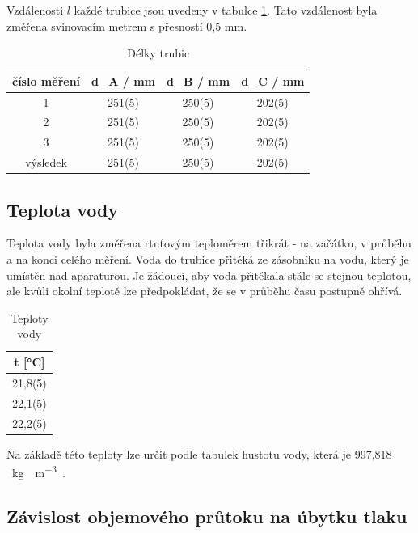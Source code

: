     Vzdálenosti \(l\) každé trubice jsou uvedeny v tabulce \ref{tab:délky}. Tato vzdálenost byla změřena svinovacím metrem s přesností 0,5 mm.

    \begin{table}[h]
        \centering
        \caption{Délky trubic}
        \label{tab:délky}
        \begin{tabular}{|c|c|c|c|} 
        \hline
            číslo měření & d_A / mm & d_B / mm & d_C / mm  \\ 
        \hline
            1            & 251(5)    & 250(5)    & 202(5)   \\
            2            & 251(5)    & 250(5)    & 202(5)   \\
            3            & 251(5)    & 250(5)    & 202(5)   \\ 
        \hline
            výsledek     & 251(5)    & 250(5)    & 202(5)   \\
        \hline
        \end{tabular}
    \end{table}

\subsection{Teplota vody}

    Teplota vody byla změřena rtuťovým teploměrem třikrát - na začátku, v průběhu a na konci celého měření. Voda do trubice přitéká ze zásobníku na vodu, který je umístěn nad aparaturou. Je žádoucí, aby voda přitékala stále se stejnou teplotou, ale kvůli okolní teplotě lze předpokládat, že se v průběhu času postupně ohřívá.

    \begin{table}[h]
        \centering
        \caption{Teploty vody}
        \label{tab:teploty_vody}
        \begin{tabular}{|c|} 
        \hline
            t [°C]   \\ 
        \hline
            21,8(5)  \\
            22,1(5)  \\
            22,2(5)  \\
        \hline
        \end{tabular}
    \end{table}

    Na základě této teploty lze určit podle tabulek hustotu vody, která je 997,818 \SI{}{\kg\water\per\m\cubed\air}.

\subsection{Závislost objemového průtoku na úbytku tlaku}


